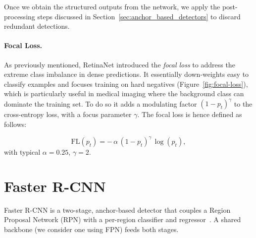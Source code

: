 Once we obtain the structured outputs from the network, we apply the post-processing steps discussed 
in Section~\ref{sec:anchor_based_detectors} to discard redundant detections.

\paragraph{Focal Loss.}

As previously mentioned, RetinaNet introduced the \emph{focal loss} to address the extreme class imbalance in dense predictions.
It essentially down-weights easy to classify examples and focuses training on hard negatives (Figure~\ref{fig:focal-loss}), which is particularly useful in medical imaging where the background class can dominate the training set. To do so it adds a modulating factor $(1-p_t)^\gamma$ to the cross-entropy loss, with a focus parameter $\gamma$. The focal loss is hence defined as follows:

$$
\mathrm{FL}(p_t) = -\,\alpha\,(1-p_t)^{\gamma}\,\log(p_t),
$$
with typical $\alpha{=}0.25$, $\gamma{=}2$.\\


\section{Faster R-CNN}

Faster R-CNN is a two-stage, anchor-based detector that couples a Region Proposal Network (RPN) with a per-region classifier and regressor~\cite{ren2016fasterrcnn}. A shared backbone (we consider one using FPN) feeds both stages.



